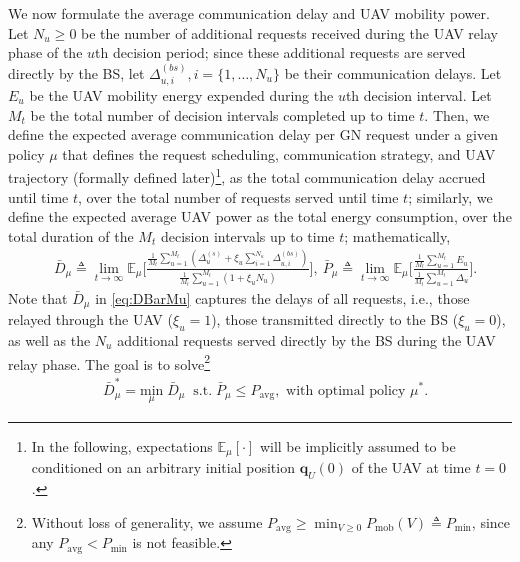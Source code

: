 \documentclass[12pt, draftcls, onecolumn]{IEEEtran}
\theoremstyle{plain}
\theoremstyle{definition}
\theoremstyle{remark}
\begin{document}
We now formulate the average communication delay and UAV mobility power. Let $N_{u}{\geq}0$ be the number of additional requests received during the UAV relay phase of the $u$th decision period; since these additional requests are served directly by the BS, let $\Delta_{u,i}^{(bs)},i=\{1,{\dots},N_{u}\}$ be their communication delays. Let $E_{u}$ be the UAV mobility energy expended during the $u$th decision interval. Let $M_{t}$ be the total number of decision intervals completed up to time $t$. Then, we define the expected average communication delay per GN request under a given policy $\mu$ that defines the request scheduling, communication strategy, and UAV trajectory (formally defined later)\footnote{In the following, expectations $\mathbb{E}_{\mu}[\cdot]$ will be implicitly assumed to be conditioned on an arbitrary initial position $\mathbf{q}_{U}(0)$ of the UAV at time $t{=}0$.}, as the total communication delay accrued until time $t$, over the total number of requests served until time $t$; similarly, we define the expected average UAV power as the total energy consumption, over the total duration of the $M_{t}$ decision intervals up to time $t$; mathematically,
\begin{align}\label{eq:DBarMu}
    &\bar{D}_{\mu} \triangleq \lim_{t \rightarrow \infty} \mathbb{E}_{\mu} \Bigg[
    \frac{\frac{1}{M_t}\sum_{u = 1}^{M_t}(\Delta_u^{(s)}+\xi_u\sum_{i=1}^{N_u}\Delta_{u,i}^{(bs)})}{
    \frac{1}{M_t}\sum_{u = 1}^{M_t}(1+\xi_uN_u)
    }\Bigg],\ 	\bar{P}_{\mu} \triangleq \lim_{t \rightarrow \infty} \mathbb{E}_{\mu} \Bigg[ \frac{\frac{1}{M_t}\sum_{u = 1}^{M_t}E_u}{\frac{1}{M_t}\sum_{u = 1}^{M_t} \Delta_u}\Bigg].
\end{align}
Note that $\bar{D}_{\mu}$ in \eqref{eq:DBarMu} captures the delays of all requests, i.e., those relayed through the UAV ($\xi_{u}{=}1$), those transmitted directly to the BS ($\xi_{u}{=}0$), as well as the $N_{u}$ additional requests served directly by the BS during the UAV relay phase.
The goal is to solve\footnote{Without loss of generality, we assume $P_{\mathrm{avg}}\geq\min_{V\geq0}P_{\mathrm{mob}}(V){\triangleq}P_{\min}$, since any $P_{\mathrm{avg}}{<}P_{\min}$ is not feasible.}
\begin{align}\label{eq:OverallObj0}
    &\bar{D}_{\mu}^{*} = \underset{\mu}{\mathrm{min}} \; 
	\bar D_\mu\;\;
	\mathrm{s.t.} \; \bar P_\mu\leq P_{\mathrm{avg}},\text{ with optimal policy $\mu^{*}$.}
\end{align}
\end{document}
